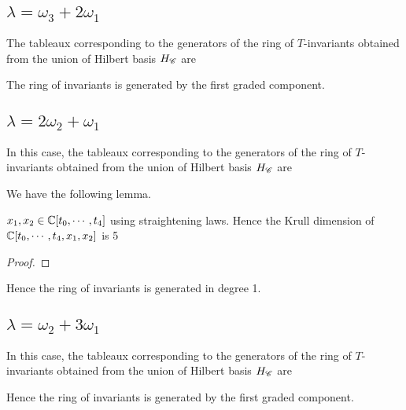 \subsection{\(\lambda=\omega_3+2\omega_1\)}
\label{sec:fv_hb311}
The tableaux corresponding to the generators of the ring of $T$-invariants obtained from the union of Hilbert basis $H_{\mathscr{C}}$ are

\noindent The ring of invariants is generated by the first graded component.

\subsection{\(\lambda = 2\omega_2+\omega_1\)}
\label{sec:fv_hb221}
In this case, the tableaux corresponding to the generators of the ring of $T$-invariants obtained from the union of Hilbert basis $H_{\mathscr{C}}$ are


\noindent We have the following lemma.
\begin{lemma}
    \(x_1,x_2 \in \mathbb{C}[t_0,\cdots,t_4]\) using straightening laws. Hence the Krull dimension of \(\mathbb{C}[t_0,\cdots,t_4,x_1,x_2]\) is 5
\end{lemma}
\begin{proof}
    
\end{proof}

\noindent Hence the ring of invariants is generated in degree 1.

\subsection{\(\lambda=\omega_2+3\omega_1\)}
\label{sec:fv_hb2111}
In this case, the tableaux corresponding to the generators of the ring of $T$-invariants obtained from the union of Hilbert basis $H_{\mathscr{C}}$ are

\noindent Hence the ring of invariants is generated by the first graded component.
